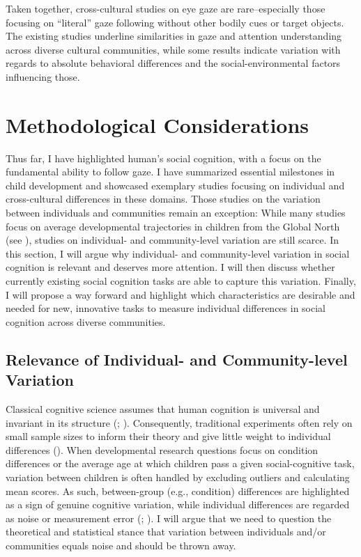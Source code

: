 \documentclass[
]{scrbook}
\begin{document}
Taken together, cross-cultural studies on eye gaze are rare\thinspace --\thinspace especially those focusing on ``literal'' gaze following without other bodily cues or target objects. The existing studies underline similarities in gaze and attention understanding across diverse cultural communities, while some results indicate variation with regards to absolute behavioral differences and the social-environmental factors influencing those.

\section{Methodological Considerations}\label{intro-methods}

Thus far, I have highlighted human's social cognition, with a focus on the fundamental ability to follow gaze. I have summarized essential milestones in child development and showcased exemplary studies focusing on individual and cross-cultural differences in these domains. Those studies on the variation between individuals and communities remain an exception: While many studies focus on average developmental trajectories in children from the Global North (see ), studies on individual- and community-level variation are still scarce. In this section, I will argue why individual- and community-level variation in social cognition is relevant and deserves more attention. I will then discuss whether currently existing social cognition tasks are able to capture this variation. Finally, I will propose a way forward and highlight which characteristics are desirable and needed for new, innovative tasks to measure individual differences in social cognition across diverse communities.

\subsection{Relevance of Individual- and Community-level Variation}\label{relevance-of-individual--and-community-level-variation}

Classical cognitive science assumes that human cognition is universal and invariant in its structure (; ). Consequently, traditional experiments often rely on small sample sizes to inform their theory and give little weight to individual differences (). When developmental research questions focus on condition differences or the average age at which children pass a given social-cognitive task, variation between children is often handled by excluding outliers and calculating mean scores. As such, between-group (e.g., condition) differences are highlighted as a sign of genuine cognitive variation, while individual differences are regarded as noise or measurement error (; ). I will argue that we need to question the theoretical and statistical stance that variation between individuals and/or communities equals noise and should be thrown away.
\end{document}
